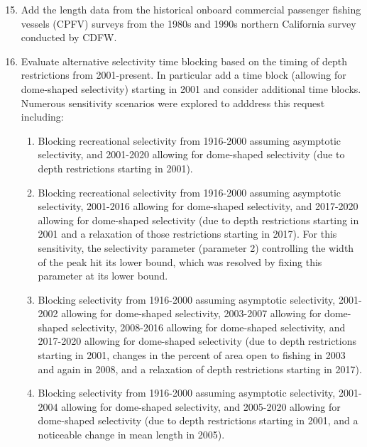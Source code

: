 \documentclass[11pt,
  english,
  a4paper,
]{article}
\begin{document}
\leavevmode\tagmcend\tagstructend\par

\begin{enumerate}
\setcounter{enumi}{14}
   
  \item Add the length data from the historical onboard commercial passenger fishing vessels (CPFV) surveys from the 1980s and 1990s northern California survey conducted by CDFW.

  \item Evaluate alternative selectivity time blocking based on the timing of depth restrictions from 2001-present. In particular add a time block (allowing for dome-shaped selectivity) starting in 2001 and consider additional time blocks. Numerous sensitivity scenarios were explored to adddress this request including:
  
  \begin{enumerate}
  
  \item Blocking recreational selectivity from 1916-2000 assuming asymptotic selectivity, and 2001-2020 allowing for dome-shaped selectivity (due to depth restrictions starting in 2001).
  
  \item Blocking recreational selectivity from 1916-2000 assuming asymptotic selectivity, 2001-2016 allowing for dome-shaped selectivity, and 2017-2020 allowing for dome-shaped selectivity (due to depth restrictions starting in 2001 and a relaxation of those restrictions starting in 2017). For this sensitivity, the selectivity parameter (parameter 2) controlling the width of the peak hit its lower bound, which was resolved by fixing this parameter at its lower bound.
  
  \item Blocking selectivity from 1916-2000 assuming asymptotic selectivity, 2001-2002 allowing for dome-shaped selectivity, 2003-2007 allowing for dome-shaped selectivity, 2008-2016 allowing for dome-shaped selectivity, and 2017-2020 allowing for dome-shaped selectivity (due to depth restrictions starting in 2001, changes in the percent of area open to fishing in 2003 and again in 2008, and a relaxation of depth restrictions starting in 2017).
  
  \item Blocking selectivity from 1916-2000 assuming asymptotic selectivity, 2001-2004 allowing for dome-shaped selectivity, and 2005-2020 allowing for dome-shaped selectivity (due to depth restrictions starting in 2001, and a noticeable change in mean length in 2005).
  

\end{enumerate}
\end{enumerate}
\end{document}
